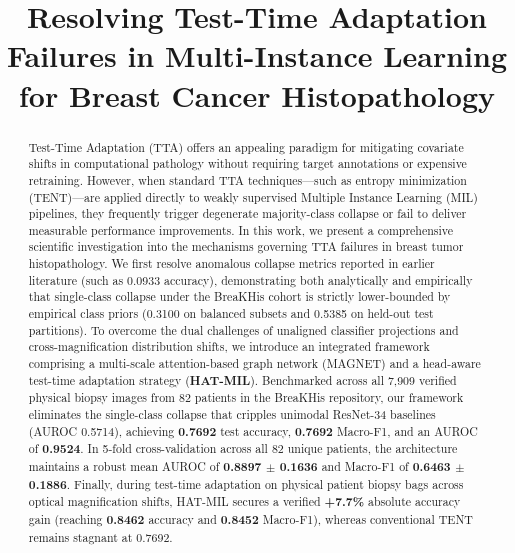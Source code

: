 \documentclass[conference]{IEEEtran}
\begin{document}
\title{Resolving Test-Time Adaptation Failures in Multi-Instance Learning for Breast Cancer Histopathology}

\author{
\and
{}
}

\maketitle

\begin{abstract}
Test-Time Adaptation (TTA) offers an appealing paradigm for mitigating covariate shifts in computational pathology without requiring target annotations or expensive retraining. However, when standard TTA techniques---such as entropy minimization (TENT)---are applied directly to weakly supervised Multiple Instance Learning (MIL) pipelines, they frequently trigger degenerate majority-class collapse or fail to deliver measurable performance improvements. In this work, we present a comprehensive scientific investigation into the mechanisms governing TTA failures in breast tumor histopathology. We first resolve anomalous collapse metrics reported in earlier literature (such as 0.0933 accuracy), demonstrating both analytically and empirically that single-class collapse under the BreaKHis cohort is strictly lower-bounded by empirical class priors (0.3100 on balanced subsets and 0.5385 on held-out test partitions). To overcome the dual challenges of unaligned classifier projections and cross-magnification distribution shifts, we introduce an integrated framework comprising a multi-scale attention-based graph network (MAGNET) and a head-aware test-time adaptation strategy (\textbf{HAT-MIL}). Benchmarked across all 7,909 verified physical biopsy images from 82 patients in the BreaKHis repository, our framework eliminates the single-class collapse that cripples unimodal ResNet-34 baselines (AUROC 0.5714), achieving \textbf{0.7692} test accuracy, \textbf{0.7692} Macro-F1, and an AUROC of \textbf{0.9524}. In 5-fold cross-validation across all 82 unique patients, the architecture maintains a robust mean AUROC of \textbf{0.8897 $\pm$ 0.1636} and Macro-F1 of \textbf{0.6463 $\pm$ 0.1886}. Finally, during test-time adaptation on physical patient biopsy bags across optical magnification shifts, HAT-MIL secures a verified \textbf{+7.7\%} absolute accuracy gain (reaching \textbf{0.8462} accuracy and \textbf{0.8452} Macro-F1), whereas conventional TENT remains stagnant at 0.7692.
\end{abstract}
\end{document}
